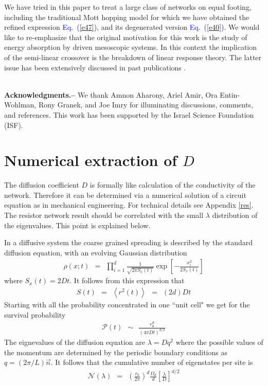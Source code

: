 \documentclass[onecolumn,fleqn,12pt,openany,draft]{book}
\newcommand{\beq}{\begin{eqnarray}}
\newcommand{\eeq}{\end{eqnarray}}
\newcommand{\Eq}[1]{\textcolor{blue}{Eq.\!\!~(\ref{#1})}}
\begin{document}
We have tried in this paper to treat a large class of 
networks on equal footing, including the traditional Mott hopping model
for which we have obtained the refined expression \Eq{e47}, 
and its degenerated version \Eq{e40}.   
We would like to re-emphasize that the original motivation 
for this work is the study of energy absorption by driven mesoscopic systems. 
In this context the implication of the semi-linear crossover 
is the breakdown of linear response theory. The latter 
issue has been extensively discussed in past publications \cite{slk}. 

\ \\

{\bf Acknowledgments.-- }
We thank Amnon Aharony, Ariel Amir, Ora Entin-Wohlman, Rony Granek, and Joe Imry 
for illuminating discussions, comments, and references. 
This work has been supported by the Israel Science Foundation (ISF). 



\appendix


\section{Numerical extraction of $D$}
\label{diff}

The diffusion coefficient $D$ is formally like calculation 
of the conductivity of the network. Therefore it can be determined 
via a numerical solution of a circuit equation  
as in mechanical engineering.  
For technical details see Appendix \ref{res}. 
%
The resistor network result should be correlated 
with the small $\lambda$ distribution of the eigenvalues.
This point is explained below.

In a diffusive system the coarse grained spreading 
is described by the standard diffusion equation,
with an evolving Gaussian distribution  
%  
\beq
\rho(x;t) \ \ = \ \ \prod_{i=1}^d \frac{1}{\sqrt{2\pi S_x(t)}} 
\exp\left[-\frac{x_i^2}{2S_x(t)} \right]
\eeq
%
where $S_x(t)=2Dt$. It follows from this expression that 
% 
\beq
S(t) \ \ = \ \ \left\langle r^2(t) \right\rangle  \ \ = \ \ (2d)Dt
\eeq
%
Starting with all the probability concentrated 
in one ``unit cell" we get for the survival probability 
%
\beq
\mathcal{P}(t) \ \ \sim \ \ \frac{r_0^d}{\left({4\pi D t}\right)^{d/2}} 
\eeq
%
The eignevalues of the diffusion equation are $\lambda=Dq^2$ 
where the possible values of the momentum are determined  
by the periodic boundary conditions as $q=(2\pi/L)\vec{n}$. 
It follows that the cumulative number of eigenstates 
per site is  
%
\beq 
\mathcal{N}(\lambda) \ \ = \ \ 
\left(\frac{r_0}{2\pi}\right)^d
\frac{\Omega_d}{d}
\left[\frac{\lambda}{D}\right]^{d/2}
\eeq
\end{document}
